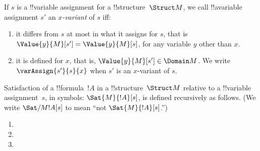 \documentclass[../../../../include/open-logic-chapter]{subfiles}
\begin{document}
\begin{defn}[$x$-Variant]
If $s$ is a !!{variable} assignment for a !!{structure}~$\Struct M$, we
call !!a{variable} assignment $s'$ an \emph{$x$-variant} of $s$ iff:
\begin{enumerate}
\item it differs from $s$ at most in what it assigns for $s$, that is 
 $\Value{y}{M}[s'] = \Value{y}{M}[s]$, for any variable $y$ other 
 than $x$.
\item it is defined for $x$, that is, $\Value{y}{M}[s'] \in \Domain M$.
We write $\varAssign{s'}{s}{x}$ when $s'$ is an $x$-variant of $s$.
\end{enumerate}
\end{defn}


\begin{defn}[Satisfaction]
Satisfaction of a !!{formula}~$!A$ in a !!{structure}~$\Struct M$
relative to a !!{variable} assignment~$s$, in symbols:
$\Sat{M}{!A}[s]$, is defined recursively as follows. (We write
$\Sat/{M}{!A}[s]$ to mean ``not $\Sat{M}{!A}[s]$.'')
\begin{enumerate}


\item {}

\item {}

\item {}







\end{enumerate}
\end{defn}
\end{document}
